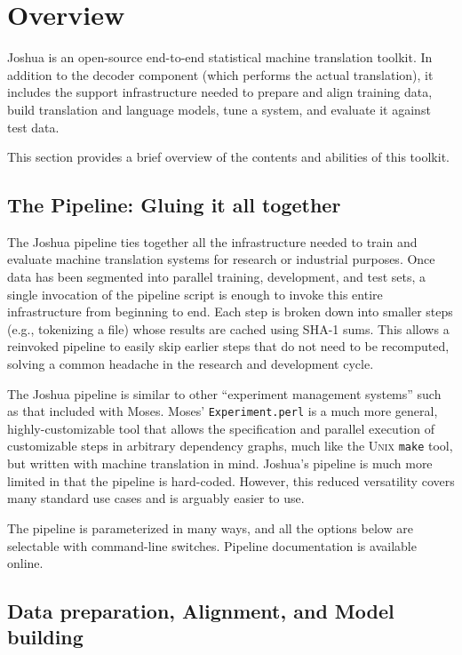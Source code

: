 \documentclass[11pt]{article}
\begin{document}
\section{Overview}

Joshua is an open-source end-to-end statistical machine translation
toolkit. In addition to the decoder component (which performs the
actual translation), it includes the support infrastructure needed to
prepare and align training data, build translation and language
models, tune a system, and evaluate it against test data. 

This section provides a brief overview of the contents and abilities
of this toolkit.

\subsection{The Pipeline: Gluing it all together}

The Joshua pipeline ties together all the infrastructure needed to
train and evaluate machine translation systems for research or
industrial purposes. Once data has been segmented into parallel
training, development, and test sets, a single invocation of the
pipeline script is enough to invoke this entire infrastructure from
beginning to end. Each step is broken down into smaller steps (e.g.,
tokenizing a file) whose results are cached using SHA-1 sums. This
allows a reinvoked pipeline to easily skip earlier steps that do not
need to be recomputed, solving a common headache in the research and
development cycle.

The Joshua pipeline is similar to other ``experiment
management systems'' such as that included with Moses.  Moses'
\verb|Experiment.perl| is a much more general, highly-customizable
tool that allows the specification and parallel execution of
customizable steps in arbitrary dependency graphs, much like the
\textsc{Unix} \verb|make| tool, but written with machine translation
in mind. Joshua's pipeline is much more limited in that the pipeline
is hard-coded. However, this reduced versatility covers many standard
use cases and is arguably easier to use. 

The pipeline is parameterized in many ways, and all the options below
are selectable with command-line switches. Pipeline documentation is
available online.

\subsection{Data preparation, Alignment, and Model building}
\end{document}
